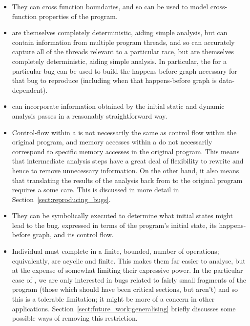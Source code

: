 \begin{itemize}
\item
  They can cross function boundaries, and so can be used to model
  cross-function properties of the program.
\item
  {\STateMachines} are themselves completely deterministic, aiding
  simple analysis, but can contain information from multiple program
  threads, and so can accurately capture all of the threads relevant
  to a particular race, but are themselves completely deterministic,
  aiding simple analysis.  In particular, the {\StateMachine} for a
  particular bug can be used to build the happens-before graph
  necessary for that bug to reproduce (including when that
  happens-before graph is data-dependent).
\item
  {\STateMachines} can incorporate information obtained by the initial
  static and dynamic analysis passes in a reasonably straightforward
  way.
\item
  Control-flow within a {\StateMachine} is not necessarily the same as
  control flow within the original program, and memory accesses within
  a {\StateMachine} do not necessarily correspond to specific memory
  accesses in the original program.  This means that intermediate
  analysis steps have a great deal of flexibility to rewrite
  {\StateMachines} and hence to remove unnecessary information.  On
  the other hand, it also means that translating the results of the
  analysis back from {\StateMachines} to the original program requires
  a some care.  This is discussed in more detail in
  Section~\ref{sect:reproducing_bugs}.
\item
  They can be symbolically executed to determine what initial states
  might lead to the bug, expressed in terms of the program's initial
  state, its happens-before graph, and its control flow.
\item
  Individual {\StateMachines} must complete in a finite, bounded,
  number of operations; equivalently, {\StateMachines} are acyclic and
  finite.  This makes them far easier to analyse, but at the expense
  of somewhat limiting their expressive power.  In the particular case
  of {\technique}, we are only interested in bugs related to fairly
  small fragments of the program (those which should have been
  critical sections, but aren't) and so this is a tolerable
  limitation; it might be more of a concern in other applications.
  Section~\ref{sect:future_work:generalising} briefly discusses some
  possible ways of removing this restriction.
\end{itemize}

